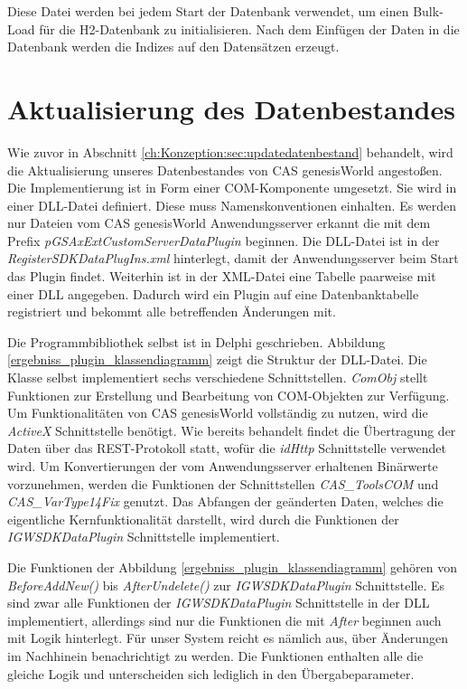 Diese Datei werden bei jedem Start der Datenbank verwendet, um einen Bulk-Load für die H2-Datenbank zu initialisieren. Nach dem Einfügen der Daten in die Datenbank werden die Indizes auf den Datensätzen erzeugt.


\section{Aktualisierung des Datenbestandes}

Wie zuvor in Abschnitt \ref{ch:Konzeption:sec:updatedatenbestand} behandelt, wird die Aktualisierung unseres Datenbestandes von CAS genesisWorld angestoßen. Die Implementierung ist in Form einer COM-Komponente umgesetzt. Sie wird in einer DLL-Datei definiert. Diese muss Namenskonventionen einhalten. Es werden nur Dateien vom CAS genesisWorld Anwendungsserver erkannt die mit dem Prefix \textit{pGSAxExtCustomServerDataPlugin} beginnen. Die DLL-Datei ist in der \textit{RegisterSDKDataPlugIns.xml} hinterlegt, damit der Anwendungsserver beim Start das Plugin findet. Weiterhin ist in der XML-Datei eine Tabelle paarweise mit einer DLL angegeben. Dadurch wird ein Plugin auf eine Datenbanktabelle registriert und bekommt alle betreffenden Änderungen mit.

Die Programmbibliothek selbst ist in Delphi geschrieben. Abbildung \ref{ergebniss_plugin_klassendiagramm} zeigt die Struktur der DLL-Datei. Die Klasse selbst implementiert sechs verschiedene Schnittstellen. \textit{ComObj} stellt Funktionen zur Erstellung und Bearbeitung von COM-Objekten zur Verfügung. Um Funktionalitäten von CAS genesisWorld vollständig zu nutzen, wird die \textit{ActiveX} Schnittstelle benötigt. Wie bereits behandelt findet die Übertragung der Daten über das REST-Protokoll statt, wofür die \textit{idHttp} Schnittstelle verwendet wird. Um Konvertierungen der vom Anwendungsserver erhaltenen Binärwerte vorzunehmen, werden die Funktionen der Schnittstellen \textit{CAS\_ToolsCOM} und \textit{CAS\_VarType14Fix} genutzt. Das Abfangen der geänderten Daten, welches die eigentliche Kernfunktionalität darstellt, wird durch die Funktionen der \textit{IGWSDKDataPlugin} Schnittstelle implementiert.

Die Funktionen der Abbildung \ref{ergebniss_plugin_klassendiagramm} gehören von \textit{BeforeAddNew()} bis \textit{AfterUndelete()} zur \textit{IGWSDKDataPlugin} Schnittstelle. Es sind zwar alle Funktionen der \textit{IGWSDKDataPlugin} Schnittstelle in der DLL implementiert, allerdings sind nur die Funktionen die mit \textit{After} beginnen auch mit Logik hinterlegt. Für unser System reicht es nämlich aus, über Änderungen im Nachhinein benachrichtigt zu werden. Die Funktionen enthalten alle die gleiche Logik und unterscheiden sich lediglich in den Übergabeparameter.

